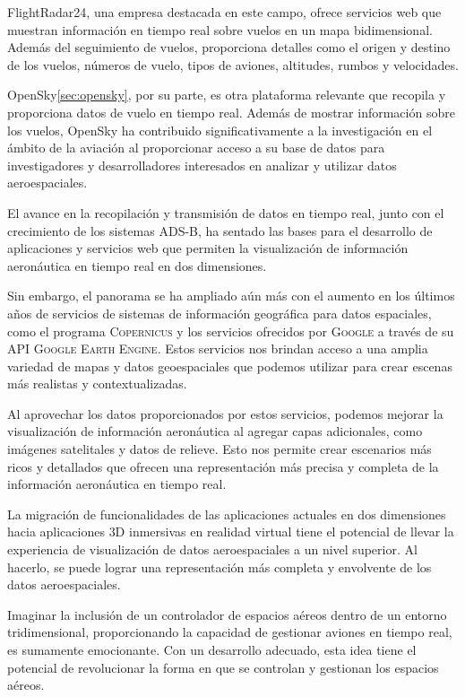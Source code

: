 \documentclass[a4paper, 11pt]{book}
\begin{document}
FlightRadar24, una empresa destacada en este campo, ofrece servicios web que muestran información en tiempo real sobre vuelos en un mapa bidimensional. Además del seguimiento de vuelos, proporciona detalles como el origen y destino de los vuelos, números de vuelo, tipos de aviones, altitudes, rumbos y velocidades.

OpenSky\ref{sec:opensky}, por su parte, es otra plataforma relevante que recopila y proporciona datos de vuelo en tiempo real. Además de mostrar información sobre los vuelos, OpenSky ha contribuido significativamente a la investigación en el ámbito de la aviación al proporcionar acceso a su base de datos para investigadores y desarrolladores interesados en analizar y utilizar datos aeroespaciales.

El avance en la recopilación y transmisión de datos en tiempo real, junto con el crecimiento de los sistemas \textsc{ADS-B}, ha sentado las bases para el desarrollo de aplicaciones y servicios web que permiten la visualización de información aeronáutica en tiempo real en dos dimensiones.

Sin embargo, el panorama se ha ampliado aún más con el aumento en los últimos años de servicios de sistemas de información geográfica para datos espaciales, como el programa \textsc{Copernicus} y los servicios ofrecidos por \textsc{Google} a través de su \textsc{API} \textsc{Google Earth Engine}. Estos servicios nos brindan acceso a una amplia variedad de mapas y datos geoespaciales que podemos utilizar para crear escenas más realistas y contextualizadas.

Al aprovechar los datos proporcionados por estos servicios, podemos mejorar la visualización de información aeronáutica al agregar capas adicionales, como imágenes satelitales y datos de relieve. Esto nos permite crear escenarios más ricos y detallados que ofrecen una representación más precisa y completa de la información aeronáutica en tiempo real.

La migración de funcionalidades de las aplicaciones actuales en dos dimensiones hacia aplicaciones \textsc{3D} inmersivas en realidad virtual tiene el potencial de llevar la experiencia de visualización de datos aeroespaciales a un nivel superior. Al hacerlo, se puede lograr una representación más completa y envolvente de los datos aeroespaciales.

Imaginar la inclusión de un controlador de espacios aéreos dentro de un entorno tridimensional, proporcionando la capacidad de gestionar aviones en tiempo real, es sumamente emocionante. Con un desarrollo adecuado, esta idea tiene el potencial de revolucionar la forma en que se controlan y gestionan los espacios aéreos.
\end{document}
